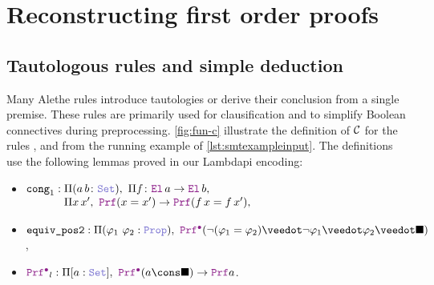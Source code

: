 \chapter{Reconstructing first order proofs}\label{ch:reconstruction-ul}

\section{Tautologous rules and simple deduction}
\label{sec:elem-rules}

Many Alethe rules introduce tautologies or derive their conclusion from a single premise.
%
These rules are primarily used for clausification and to simplify Boolean connectives during
preprocessing.
%
\cref{fig:fun-c} illustrate the definition of $\cal{C}$ for the rules ,  and  from the running example of \cref{lst:smtexampleinput}.
The definitions use the following lemmas proved in our Lambdapi encoding:
\begin{itemize}
\item $\kw{cong}_1 :
    \begin{array}[t]{@{}l@{}}
        \Pi (a\,b \colon \set),\ \Pi f \colon \el\,a \ra \el\,b, \\
        \Pi x\,x',\ \prf (x = x') \ra \prf (f\,x = f\,x'),
    \end{array}$
\item $\kw{equiv\_pos2} : \Pi (\varphi_1~\varphi_2: \prop),\ \pid (\neg (\varphi_1 = \varphi_2) \veedot \neg \varphi_1 \veedot \varphi_2 \veedot \nil )$,
\item $\pid_l : \Pi [a : \set],\ \pid (a \cons \nil) \ra \prf a$.
\end{itemize}


